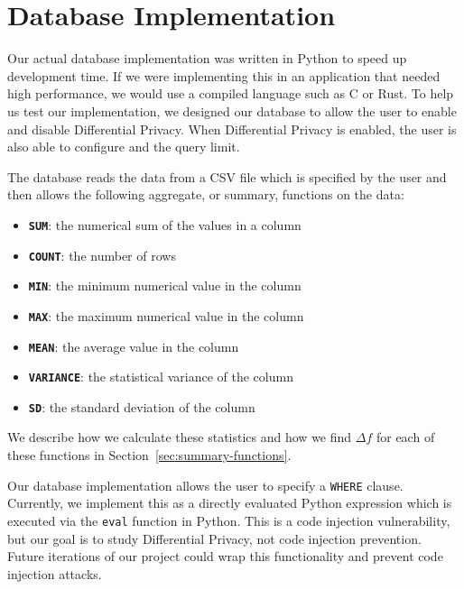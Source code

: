 \documentclass[conference,11pt]{IEEEtran}
\begin{document}
\section{Database Implementation}\label{sec:db-impl}
Our actual database implementation was written in Python to speed up development
time. If we were implementing this in an application that needed high
performance, we would use a compiled language such as C or Rust.  To help us
test our implementation, we designed our database to allow the user to enable
and disable Differential Privacy. When Differential Privacy is enabled, the user
is also able to configure {\textepsilon} and the query limit.

The database reads the data from a CSV file which is specified by the user and
then allows the following aggregate, or summary, functions on the data:
\begin{itemize}
    \item \textbf{\texttt{SUM}}: the numerical sum of the values in a column
    \item \textbf{\texttt{COUNT}}: the number of rows
    \item \textbf{\texttt{MIN}}: the minimum numerical value in the column
    \item \textbf{\texttt{MAX}}: the maximum numerical value in the column
    \item \textbf{\texttt{MEAN}}: the average value in the column
    \item \textbf{\texttt{VARIANCE}}: the statistical variance of the column
    \item \textbf{\texttt{SD}}: the standard deviation of the column
\end{itemize}

We describe how we calculate these statistics and how we find $\Delta f$ for
each of these functions in Section~\ref{sec:summary-functions}.

Our database implementation allows the user to specify a \texttt{WHERE} clause.
Currently, we implement this as a directly evaluated Python expression which is
executed via the \texttt{eval} function in Python. This is a code injection
vulnerability, but our goal is to study Differential Privacy, not code injection
prevention. Future iterations of our project could wrap this functionality and
prevent code injection attacks.
\end{document}
